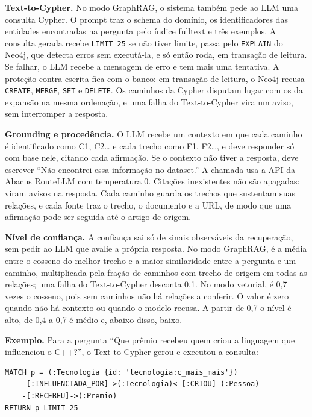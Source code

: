 \documentclass[12pt]{article}
\begin{document}
\textbf{Text-to-Cypher.} No modo GraphRAG, o sistema também pede ao LLM uma consulta Cypher.
O prompt traz o schema do domínio, os identificadores das entidades encontradas na pergunta
pelo índice fulltext e três exemplos. A consulta gerada recebe \texttt{LIMIT 25} se não
tiver limite, passa pelo \texttt{EXPLAIN} do Neo4j, que detecta erros sem executá-la, e
só então roda, em transação de leitura. Se falhar, o LLM recebe a mensagem de erro e tem
mais uma tentativa. A proteção contra escrita fica com o banco: em transação de leitura,
o Neo4j recusa \texttt{CREATE}, \texttt{MERGE}, \texttt{SET} e \texttt{DELETE}. Os caminhos da
Cypher disputam lugar com os da expansão na mesma ordenação, e uma falha do Text-to-Cypher
vira um aviso, sem interromper a resposta.

\textbf{Grounding e procedência.} O LLM recebe um contexto em que cada caminho é
identificado como C1, C2\ldots{} e cada trecho como F1, F2\ldots, e deve responder só com
base nele, citando cada afirmação. Se o contexto não tiver a resposta, deve escrever
``Não encontrei essa informação no dataset.'' A chamada usa a API da Abacus RouteLLM com
temperatura 0. Citações inexistentes não são apagadas: viram avisos na resposta. Cada
caminho guarda os trechos que sustentam suas relações, e cada fonte traz o trecho, o
documento e a URL, de modo que uma afirmação pode ser seguida até o artigo de origem.

\textbf{Nível de confiança.} A confiança sai só de sinais observáveis da recuperação, sem
pedir ao LLM que avalie a própria resposta. No modo GraphRAG, é a média entre o cosseno
do melhor trecho e a maior similaridade entre a pergunta e um caminho, multiplicada pela
fração de caminhos com trecho de origem em todas as relações; uma falha do Text-to-Cypher
desconta 0,1. No modo vetorial, é 0,7 vezes o cosseno, pois sem caminhos não há relações a
conferir. O valor é zero quando não há contexto ou quando o modelo recusa. A partir de
0,7 o nível é alto, de 0,4 a 0,7 é médio e, abaixo disso, baixo.

\textbf{Exemplo.} Para a pergunta ``Que prêmio recebeu quem criou a linguagem que
influenciou o C++?'', o Text-to-Cypher gerou e executou a consulta:

{\small
\begin{verbatim}
MATCH p = (:Tecnologia {id: 'tecnologia:c_mais_mais'})
    -[:INFLUENCIADA_POR]->(:Tecnologia)<-[:CRIOU]-(:Pessoa)
    -[:RECEBEU]->(:Premio)
RETURN p LIMIT 25
\end{verbatim}
}
\end{document}
